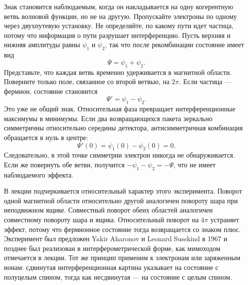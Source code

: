 Знак становится наблюдаемым, когда он накладывается на одну когерентную ветвь волновой функции, но не на другую. Пропускайте электроны по одному через двухпутевую установку. Не определяйте, по какому пути идет частица, потому что информация о пути разрушает интерференцию. Пусть верхняя и нижняя амплитуды равны \(\psi_1\) и \(\psi_2\), так что после рекомбинации состояние имеет вид
\begin{equation}
\Psi=\psi_1+\psi_2.
\end{equation}
Представьте, что каждая ветвь временно удерживается в магнитной области. Поверните только поле, связанное со второй ветвью, на \(2\pi\). Если частица — фермион, состояние становится
\begin{equation}
\Psi'=\psi_1-\psi_2.
\end{equation}
Это уже не общий знак. Относительная фаза превращает интерференционные максимумы в минимумы. Если два возвращающихся пакета зеркально симметричны относительно середины детектора, антисимметричная комбинация обращается в нуль в центре:
\begin{equation}
\Psi'(0)=\psi_1(0)-\psi_2(0)=0.
\end{equation}
Следовательно, в этой точке симметрии электрон никогда не обнаруживается. Если же повернуть обе ветви, получится \(-\psi_1-\psi_2=-\Psi\), что не имеет наблюдаемого эффекта.

В лекции подчеркивается относительный характер этого эксперимента. Поворот одной магнитной области относительно другой аналогичен повороту шара при неподвижном ящике. Совместный поворот обеих областей аналогичен совместному повороту шара и ящика. Относительный поворот на \(4\pi\) устраняет эффект, потому что фермионное состояние тогда возвращается со знаком плюс. Эксперимент был предложен Yakir Aharonov и Leonard Susskind в 1967 и позднее был реализован в интерферометрической форме, как мимоходом отмечается в лекции. Тот же принцип применим к электронам или заряженным ионам: сдвинутая интерференционная картина указывает на состояние с полуцелым спином, тогда как несдвинутая — на состояние с целым спином.

\begin{classroomqa}
\end{classroomqa}

